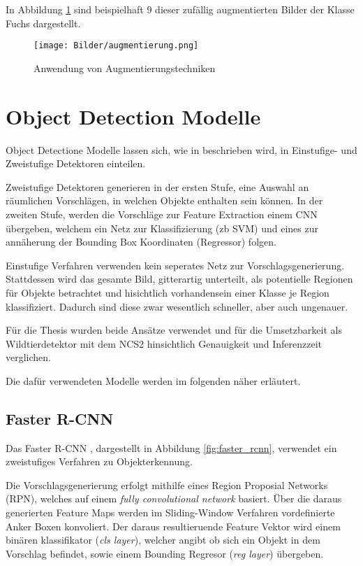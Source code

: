 In Abbildung \ref{fig:augmentierung} sind beispielhaft 9 dieser 
zufällig augmentierten Bilder der Klasse Fuchs dargestellt.


\begin{figure}[H]
    \label{fig:augmentierung}
    \centering
    \texttt{[image: Bilder/augmentierung.png]}
    \caption{Anwendung von Augmentierungstechniken}
\end{figure}


\section{Object Detection Modelle}


Object Detectione Modelle lassen sich, wie in 
\cite{wuRecentAdvancesDeep2019} beschrieben wird,
in Einstufige- und Zweistufige Detektoren einteilen.

Zweistufige Detektoren generieren in der 
ersten Stufe, 
eine Auswahl an räumlichen Vorschlägen, in welchen 
Objekte enthalten sein können. In der zweiten Stufe, 
werden die Vorschläge zur Feature Extraction 
einem CNN übergeben, welchem ein Netz zur Klassifizierung 
(zb SVM) und eines zur annäherung der Bounding Box 
Koordinaten (Regressor) folgen.

Einstufige Verfahren verwenden kein seperates 
Netz zur Vorschlagsgenerierung. Stattdessen 
wird das gesamte Bild, gitterartig unterteilt,
als potentielle Regionen für Objekte betrachtet 
und hisichtlich vorhandensein einer Klasse je 
Region klassifiziert.
Dadurch sind diese zwar wesentlich schneller, 
aber auch ungenauer.


Für die Thesis wurden beide Ansätze verwendet und 
für die Umsetzbarkeit als Wildtierdetektor 
mit dem NCS2 hinsichtlich Genauigkeit und 
Inferenzzeit verglichen.

Die dafür verwendeten Modelle werden im folgenden 
näher erläutert.



\subsection*{Faster R-CNN}

Das Faster R-CNN \cite{renFasterRCNNRealTime2016a}, 
dargestellt in Abbildung \ref{fig:faster_rcnn}, 
verwendet ein zweistufiges Verfahren zu 
Objekterkennung.

Die Vorschlagsgenerierung erfolgt mithilfe eines 
Region Proposial Networks (RPN), welches auf 
einem \textit{fully convolutional network} 
basiert.
Über die daraus generierten Feature Maps werden im 
Sliding-Window Verfahren vordefinierte Anker Boxen 
konvoliert.
Der daraus resultieruende Feature Vektor wird 
einem binären klassifikator (\textit{cls layer}), 
welcher angibt ob sich ein Objekt in dem Vorschlag befindet, 
sowie einem Bounding Regresor (\textit{reg layer}) übergeben.

